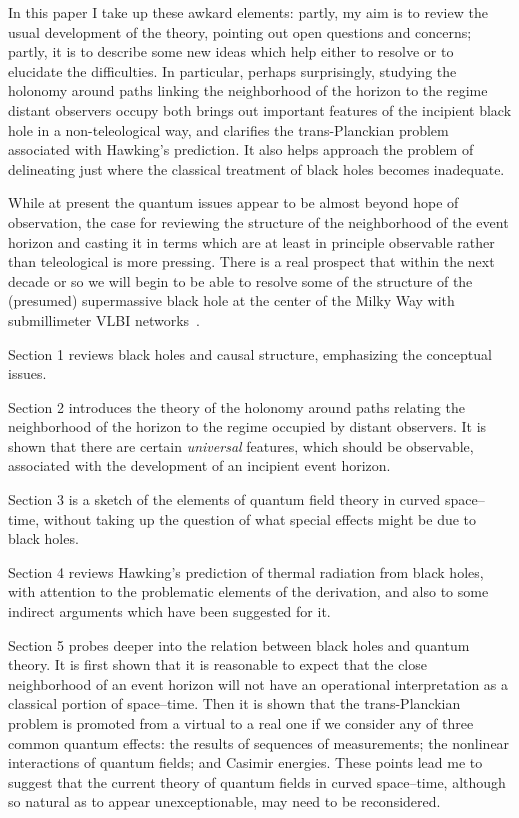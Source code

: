\documentclass[12pt]{article}
\begin{document}
In this paper I take up these awkard elements:  partly, my aim is to review the usual development of the theory, pointing out open questions and concerns; partly, it is to describe some new ideas which help either to resolve or to elucidate the difficulties.  In particular, perhaps surprisingly, studying the holonomy around paths linking the neighborhood of the horizon to the regime distant observers occupy both brings out important features of the incipient black hole in a non-teleological way, and clarifies the trans-Planckian problem associated with Hawking's prediction.  It also helps approach the problem of delineating just where the classical treatment of black holes becomes inadequate.

While at present the quantum issues appear to be almost 
beyond hope of observation, the case for
reviewing the structure of the neighborhood of the event horizon and casting it in terms which are at least in principle observable rather than teleological is more pressing.  There is a real prospect that within the next decade or so we will begin to be able to resolve some of the structure of the (presumed) supermassive black hole at the center of the Milky Way with submillimeter VLBI networks~\citep{Doeleman:2009te}.

Section 1 reviews black holes and causal structure, emphasizing the conceptual issues.

Section 2 introduces the theory of the holonomy around paths relating the neighborhood of the horizon to the regime occupied by distant observers.  It is shown that there are certain {\em universal} features, which should be observable, associated with the development of an incipient event horizon.

Section 3 is a sketch of the elements of quantum field theory in curved space--time, without taking up the question of what special effects might be due to black holes.

Section 4 reviews Hawking's prediction of thermal radiation from black holes, with attention to the problematic elements of the derivation, and also to some indirect arguments which have been suggested for it.

Section 5 probes deeper into the relation between black holes and quantum theory.  It is first shown that it is reasonable to expect that the close neighborhood of an event horizon will not have an operational interpretation as a classical portion of space--time.  Then it is shown that the trans-Planckian problem is promoted from a virtual to a real one if we consider any of three common quantum effects:  the results of sequences of measurements; the nonlinear interactions of quantum fields; and Casimir energies.  These points lead me to suggest that the current theory of quantum fields in curved space--time, although so natural as to appear unexceptionable, may need to be reconsidered.
\end{document}
